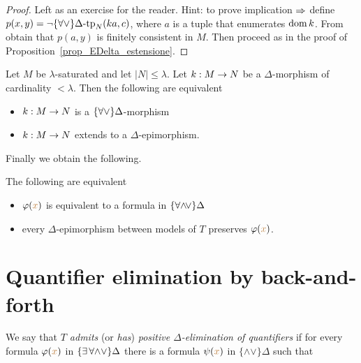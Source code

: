 \begin{proof} Left as an exercise for the reader.
  Hint: to prove implication $\Rightarrow$ define $p(x,y)=\neg\{\forall\vee\}\Delta\mbox{\rm -tp}_N (ka,c)$, where $a$ is a tuple that enumerates $\mathop{\rm dom} k$. From  obtain that $p(a,y)$ is finitely consistent in $M$.
  Then proceed as in the proof of Proposition~\ref{prop_EDelta_estensione}.
\end{proof}

\begin{corollary}\label{corol_ADelta_estensione}
Let $M$ be $\lambda$-saturated and let $|N|\le\lambda$. Let $k:M\rightarrow N$ be a $\Delta$-morphism of cardinality $<\lambda$. Then the following are equivalent
\begin{itemize}
\item[1.] $k:M\rightarrow N$ is a $\{\forall\vee\}\Delta$-morphism
\item[2.] $k:M\rightarrow N$ extends to a $\Delta$-epimorphism.
\end{itemize}
\end{corollary}

Finally we obtain the following.

\begin{theorem}
The following are equivalent
\begin{itemize}
\item[1.] $\varphi({\color{brown} x})$ is equivalent to a formula in $\{\forall{\wedge}{\!\vee}\}\Delta$
\item[2.] every $\Delta$-epimorphism between models of $T$ preserves $\varphi({\color{brown} x})$.
\end{itemize}
\end{theorem}

\section{Quantifier elimination by back-and-forth}
\label{eliminazionequantificatoricriterio}

We say that \emph{$T$ admits\/} (or \emph{has\/}) \emph{positive $\Delta$-elimination of quantifiers\/} if for every formula $\varphi({\color{brown} x})$ in $\{\exists\,\forall\mathord\wedge\mathord\vee\}\Delta$ there is a formula $\psi({\color{brown} x})$ in $\{\mathord\wedge\mathord\vee\}\Delta$ such that

